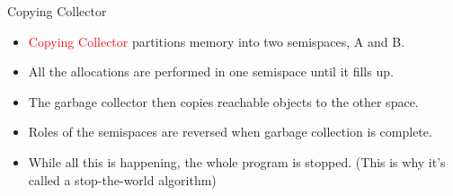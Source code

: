 \documentclass[
  10pt,
  ignorenonframetext,
]{beamer}
\providecommand{\tightlist}{%
  \setlength{\itemsep}{0pt}\setlength{\parskip}{0pt}}
\begin{document}
\begin{frame}{Copying Collector}
\protect\hypertarget{copying-collector}{}
\pause

\begin{itemize}
\tightlist
\item
  \textcolor{red}{Copying Collector} partitions
  memory into two semispaces, A and B. \pause
\item
  All the allocations are performed in one
  semispace until it fills up. \pause
\item
  The garbage collector then copies reachable
  objects to the other space. \pause
\item
  Roles of the semispaces are reversed when
  garbage collection is complete. \pause
\item
  While all this is happening, the whole program
  is stopped. (This is why it's called a
  stop-the-world algorithm)
\end{itemize}
\end{frame}
\end{document}
